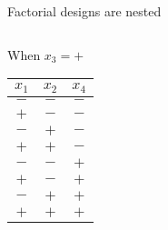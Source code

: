 \documentclass[10pt]{beamer}
\newcommand\lo{\ensuremath{\boldsymbol{-}}}
\newcommand\hi{\ensuremath{\boldsymbol{+}}}
\begin{document}
\begin{frame}{Factorial designs are nested}
\begin{columns}
\begin{column}{0.3\textwidth}
\begin{center}
When $x_3 = \hi$
\medskip
\begin{tabular}{ccc}
$x_1$ & $x_2$ & $x_4$ \\
\hline
\rowcolor{pink} \lo & \lo & \lo \\
\rowcolor{pink} \hi & \lo & \lo \\
\rowcolor{pink} \lo & \hi & \lo \\
\rowcolor{pink} \hi & \hi & \lo \\
\rowcolor{pink} \lo & \lo & \hi \\
\rowcolor{pink} \hi & \lo & \hi \\
\rowcolor{pink} \lo & \hi & \hi \\
\rowcolor{pink} \hi & \hi & \hi \\
\end{tabular}
\end{center}
\end{column}

\end{columns}	
\end{frame}
\end{document}
